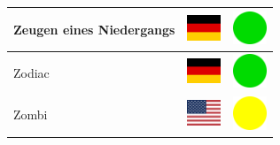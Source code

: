 \documentclass[12pt, a4paper, twoside]{report}
\begin{document}
\begin{center}
\begin{longtable}{|p{5cm}|p{2cm}|p{2cm}|}
 Zeugen eines Niedergangs                                   & \includegraphics[width=1cm]{../img/flags/de} &   \includegraphics[width=1cm]{../likes/y} \\ \hline
 Zodiac                                                     & \includegraphics[width=1cm]{../img/flags/de} &   \includegraphics[width=1cm]{../likes/y} \\ \hline
 Zombi                                                      & \includegraphics[width=1cm]{../img/flags/us} &   \includegraphics[width=1cm]{../likes/m} \\ \hline
		\end{longtable}
	\end{center}
\end{document}
